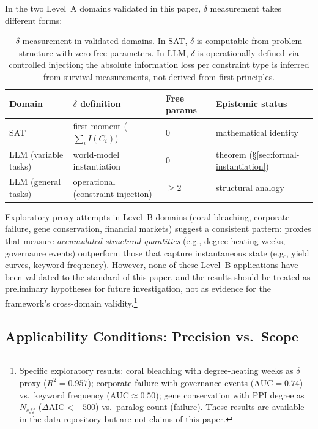 \documentclass[11pt,a4paper]{article}
\begin{document}
In the two Level~A domains validated in this paper, $\delta$ measurement takes different forms:

\begin{table}[ht]
\centering
\small
\begin{tabular}{llll}
\toprule
\textbf{Domain} & \textbf{$\delta$ definition} & \textbf{Free params} & \textbf{Epistemic status} \\
\midrule
SAT & first moment ($\sum_i I(C_i)$) & 0 & mathematical identity \\
LLM (variable tasks) & world-model instantiation & 0 & theorem (\S\ref{sec:formal-instantiation}) \\
LLM (general tasks) & operational (constraint injection) & $\geq 2$ & structural analogy \\
\bottomrule
\end{tabular}
\caption{$\delta$ measurement in validated domains. In SAT, $\delta$ is computable from problem structure with zero free parameters. In LLM, $\delta$ is operationally defined via controlled injection; the absolute information loss per constraint type is inferred from survival measurements, not derived from first principles.}
\label{tab:proxy_landscape}
\end{table}

Exploratory proxy attempts in Level~B domains (coral bleaching, corporate failure, gene conservation, financial markets) suggest a consistent pattern: proxies that measure \emph{accumulated structural quantities} (e.g., degree-heating weeks, governance events) outperform those that capture instantaneous state (e.g., yield curves, keyword frequency). However, none of these Level~B applications have been validated to the standard of this paper, and the results should be treated as preliminary hypotheses for future investigation, not as evidence for the framework's cross-domain validity.\footnote{Specific exploratory results: coral bleaching with degree-heating weeks as $\delta$ proxy ($R^2 = 0.957$); corporate failure with governance events ($\text{AUC} = 0.74$) vs.\ keyword frequency ($\text{AUC} \approx 0.50$); gene conservation with PPI degree as $N_{eff}$ ($\Delta\text{AIC} < -500$) vs.\ paralog count (failure). These results are available in the data repository but are not claims of this paper.}

\subsection{Applicability Conditions: Precision vs.\ Scope}
\end{document}
